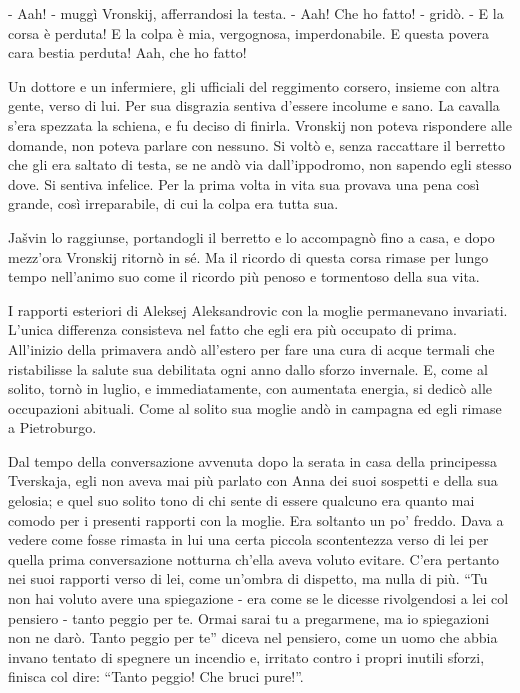 - Aah! - muggì Vronskij, afferrandosi la testa. - Aah! Che ho fatto! - gridò. - E la corsa è perduta! E la colpa è mia, vergognosa, imperdonabile. E questa povera cara bestia perduta! Aah, che ho fatto! 

Un dottore e un infermiere, gli ufficiali del reggimento corsero, insieme con altra gente, verso di lui. Per sua disgrazia sentiva d'essere incolume e sano. La cavalla s'era spezzata la schiena, e fu deciso di finirla. Vronskij non poteva rispondere alle domande, non poteva parlare con nessuno. Si voltò e, senza raccattare il berretto che gli era saltato di testa, se ne andò via dall'ippodromo, non sapendo egli stesso dove. Si sentiva infelice. Per la prima volta in vita sua provava una pena così grande, così irreparabile, di cui la colpa era tutta sua. 

Jašvin lo raggiunse, portandogli il berretto e lo accompagnò fino a casa, e dopo mezz'ora Vronskij ritornò in sé. Ma il ricordo di questa corsa rimase per lungo tempo nell'animo suo come il ricordo più penoso e tormentoso della sua vita. 

I rapporti esteriori di Aleksej Aleksandrovic con la moglie permanevano invariati. L'unica differenza consisteva nel fatto che egli era più occupato di prima. All'inizio della primavera andò all'estero per fare una cura di acque termali che ristabilisse la salute sua debilitata ogni anno dallo sforzo invernale. E, come al solito, tornò in luglio, e immediatamente, con aumentata energia, si dedicò alle occupazioni abituali. Come al solito sua moglie andò in campagna ed egli rimase a Pietroburgo. 

Dal tempo della conversazione avvenuta dopo la serata in casa della principessa Tverskaja, egli non aveva mai più parlato con Anna dei suoi sospetti e della sua gelosia; e quel suo solito tono di chi sente di essere qualcuno era quanto mai comodo per i presenti rapporti con la moglie. Era soltanto un po' freddo. Dava a vedere come fosse rimasta in lui una certa piccola scontentezza verso di lei per quella prima conversazione notturna ch'ella aveva voluto evitare. C'era pertanto nei suoi rapporti verso di lei, come un'ombra di dispetto, ma nulla di più. ``Tu non hai voluto avere una spiegazione - era come se le dicesse rivolgendosi a lei col pensiero - tanto peggio per te. Ormai sarai tu a pregarmene, ma io spiegazioni non ne darò. Tanto peggio per te'' diceva nel pensiero, come un uomo che abbia invano tentato di spegnere un incendio e, irritato contro i propri inutili sforzi, finisca col dire: ``Tanto peggio! Che bruci pure!''. 


